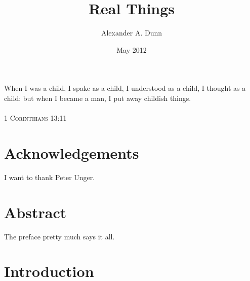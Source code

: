 \documentclass[12pt,twoside]{reedfancy}
\title{Real Things}
\author{Alexander A. Dunn}
\date{May 2012}
\newenvironment{epigram}{%
	\begin{minipage}[c]{0.75\textwidth}
	\vspace{2.5in}
	\begin{spacing}{1}
	\begin{list}{}{%
	\setlength{\labelwidth}{0pt}
	\setlength{\leftmargin}{1.4in}
	\setlength{\rightmargin}{.25in}}
	\item[]
	}{%
	\end{list}
	\end{spacing}
	\end{minipage}
	\newline
	}
\begin{document}
  \maketitle
  \frontmatter %
  \pagestyle{empty} %

\begin{epigram}
When I was a child, I spake as a child, I understood as a child, I
thought as a child: but when I became a man, I put away childish
things. \\ \\ \textsc{1 Corinthians 13:11}
\end{epigram}

\begin{spacing}{1.25}

    \chapter*{Acknowledgements}
	I want to thank Peter Unger.


    \tableofcontents

	\chapter*{Abstract}
	The preface pretty much says it all.

	\mainmatter %
	\pagestyle{fancyplain} %
  
\chapter{Introduction}


\end{spacing}
\end{document}
